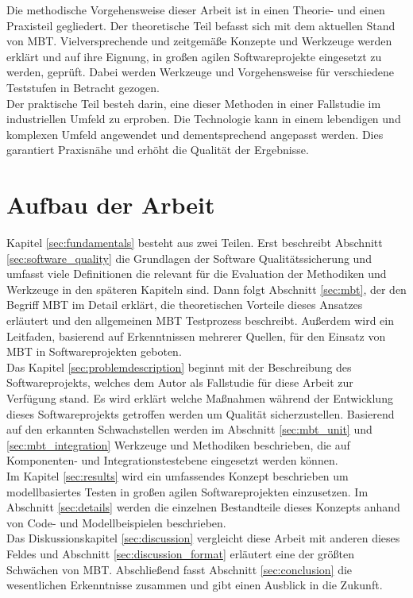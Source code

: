 Die methodische Vorgehensweise dieser Arbeit ist in einen Theorie- und einen Praxisteil gegliedert. Der theoretische Teil befasst sich mit dem aktuellen Stand von \Gls{MBT}. Vielversprechende und zeitgemäße Konzepte und Werkzeuge werden erklärt und auf ihre Eignung, in großen agilen Softwareprojekte eingesetzt zu werden, geprüft. Dabei werden Werkzeuge und Vorgehensweise für verschiedene Teststufen in Betracht gezogen.\\
Der praktische Teil besteh darin, eine dieser Methoden in einer Fallstudie im industriellen Umfeld zu erproben. Die Technologie kann in einem lebendigen und komplexen Umfeld angewendet und dementsprechend angepasst werden. Dies garantiert Praxisnähe und erhöht die Qualität der Ergebnisse.

\section{Aufbau der Arbeit}
Kapitel \ref{sec:fundamentals}  besteht aus zwei Teilen. Erst beschreibt Abschnitt \ref{sec:software_quality} die Grundlagen der Software Qualitätssicherung und umfasst viele Definitionen die relevant für die Evaluation der Methodiken und Werkzeuge in den späteren Kapiteln sind. Dann folgt Abschnitt \ref{sec:mbt}, der den Begriff \Gls{MBT} im Detail erklärt, die theoretischen Vorteile dieses Ansatzes erläutert und den allgemeinen \Gls{MBT} Testprozess beschreibt. Außerdem wird ein Leitfaden, basierend auf Erkenntnissen mehrerer Quellen, für den Einsatz von \Gls{MBT} in Softwareprojekten geboten.\\

Das Kapitel \ref{sec:problemdescription}  beginnt mit der Beschreibung des Softwareprojekts, welches dem Autor als Fallstudie für diese Arbeit zur Verfügung stand. Es wird erklärt welche Maßnahmen während der Entwicklung dieses Softwareprojekts getroffen werden um Qualität sicherzustellen. Basierend auf den erkannten Schwachstellen werden im Abschnitt \ref{sec:mbt_unit} und \ref{sec:mbt_integration} Werkzeuge und Methodiken beschrieben, die auf Komponenten- und Integrationstestebene eingesetzt werden können.\\

Im Kapitel \ref{sec:results} wird ein umfassendes Konzept beschrieben um modellbasiertes Testen in großen agilen Softwareprojekten einzusetzen. Im Abschnitt \ref{sec:details} werden die einzelnen Bestandteile dieses Konzepts anhand von Code- und Modellbeispielen beschrieben.\\

Das Diskussionskapitel \ref{sec:discussion} vergleicht diese Arbeit mit anderen dieses Feldes und Abschnitt \ref{sec:discussion_format} erläutert eine der größten Schwächen von \Gls{MBT}. Abschließend fasst Abschnitt \ref{sec:conclusion} die wesentlichen Erkenntnisse zusammen und gibt einen Ausblick in die Zukunft.